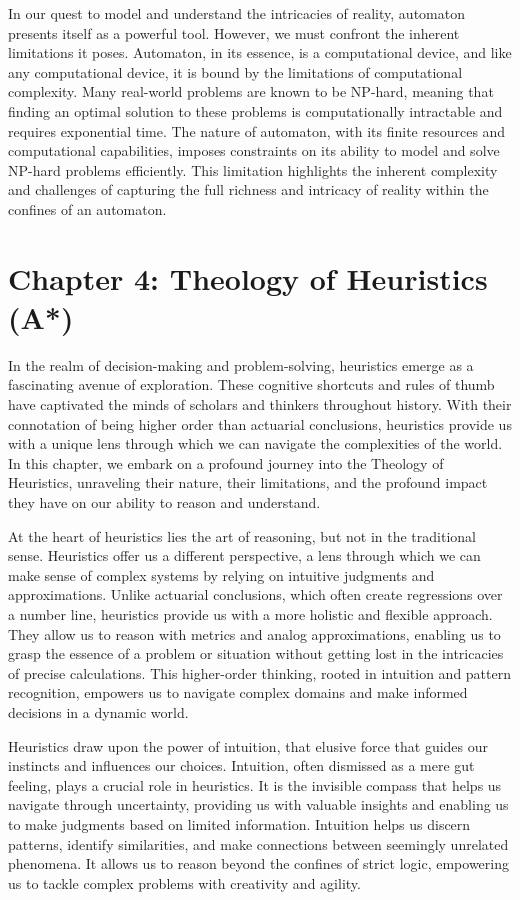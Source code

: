 \documentclass[ebook,12pt,oneside,openany]{memoir}
\begin{document}
\indent 	In our quest to model and understand the intricacies of reality, automaton presents itself as a powerful tool. However, we must confront the inherent limitations it poses. Automaton, in its essence, is a computational device, and like any computational device, it is bound by the limitations of computational complexity. Many real-world problems are known to be NP-hard, meaning that finding an optimal solution to these problems is computationally intractable and requires exponential time. The nature of automaton, with its finite resources and computational capabilities, imposes constraints on its ability to model and solve NP-hard problems efficiently. This limitation highlights the inherent complexity and challenges of capturing the full richness and intricacy of reality within the confines of an automaton.
\chapter*{Chapter 4: Theology of Heuristics (A*)}


\indent \indent In the realm of decision-making and problem-solving, heuristics emerge as a fascinating avenue of exploration. These cognitive shortcuts and rules of thumb have captivated the minds of scholars and thinkers throughout history. With their connotation of being higher order than actuarial conclusions, heuristics provide us with a unique lens through which we can navigate the complexities of the world. In this chapter, we embark on a profound journey into the Theology of Heuristics, unraveling their nature, their limitations, and the profound impact they have on our ability to reason and understand.

\indent At the heart of heuristics lies the art of reasoning, but not in the traditional sense. Heuristics offer us a different perspective, a lens through which we can make sense of complex systems by relying on intuitive judgments and approximations. Unlike actuarial conclusions, which often create regressions over a number line, heuristics provide us with a more holistic and flexible approach. They allow us to reason with metrics and analog approximations, enabling us to grasp the essence of a problem or situation without getting lost in the intricacies of precise calculations. This higher-order thinking, rooted in intuition and pattern recognition, empowers us to navigate complex domains and make informed decisions in a dynamic world.

\indent Heuristics draw upon the power of intuition, that elusive force that guides our instincts and influences our choices. Intuition, often dismissed as a mere gut feeling, plays a crucial role in heuristics. It is the invisible compass that helps us navigate through uncertainty, providing us with valuable insights and enabling us to make judgments based on limited information. Intuition helps us discern patterns, identify similarities, and make connections between seemingly unrelated phenomena. It allows us to reason beyond the confines of strict logic, empowering us to tackle complex problems with creativity and agility.
\end{document}
